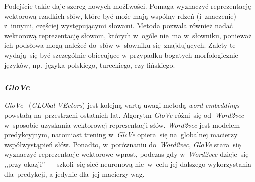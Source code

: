 \documentclass[pl]{minipw} %
\begin{document}
Podejście takie daje szereg nowych możliwości. Pomaga wyznaczyć reprezentację wektorową rzadkich słów, które być może mają wspólny rdzeń (i~znaczenie) z~innymi, częściej występującymi słowami. Metoda pozwala również nadać wektorową reprezentację słowom, których w~ogóle nie~ma w~słowniku, ponieważ ich podsłowa mogą należeć do~słów w~słowniku się~znajdujących. Zalety te wydają~się być szczególnie obiecujące w~przypadku bogatych morfologicznie języków, np.~języka polskiego, tureckiego, czy fińskiego.  

\subsubsection{\textit{GloVe}}

\textit{GloVe}~\cite{glove} (\textit{GLObal VEctors}) jest kolejną wartą uwagi metodą \textit{word embeddings} powstałą na~przestrzeni ostatnich lat. Algorytm \textit{GloVe} różni~się od~\textit{Word2vec} w~sposobie uzyskania wektorowej reprezentacji słów. \textit{Word2vec} jest modelem predykcyjnym, natomiast trening w~\textit{GloVe} opiera~się na~globalnej macierzy współwystąpień słów. Ponadto, w~porównaniu do~\textit{Word2vec}, \textit{GloVe} stara~się wyznaczyć reprezentacje wektorowe wprost, podczas gdy w~\textit{Word2vec} dzieje~się ,,przy okazji'' --- szkoli~się sieć neuronową nie~w~celu jej dalszego wykorzystania dla~predykcji, a jedynie dla~jej macierzy wag. 
\end{document}
